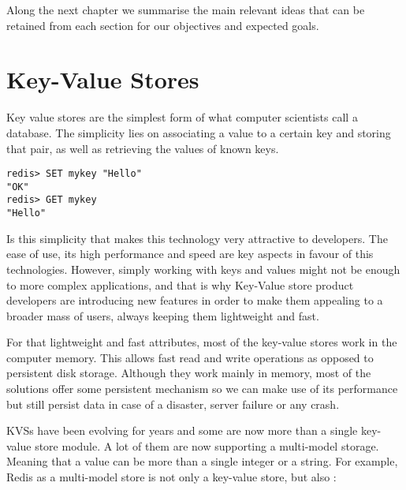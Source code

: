 Along the next chapter we summarise the main relevant ideas that can be retained from each section for our objectives and expected goals.

\section{Key-Value Stores} %
\label{sec:key-value_stores}

Key value stores are the simplest form of what computer scientists call a database. The simplicity lies on associating a value to a certain key and storing that pair, as well as retrieving the values of known keys. \cite{db-engine:1}

\lstset{language=Bash, caption=Redis Set \& Get, label=lst:redisSetGet}
\begin{lstlisting}
redis> SET mykey "Hello"
"OK"
redis> GET mykey
"Hello"
\end{lstlisting}

Is this simplicity that makes this technology very attractive to developers. The ease of use, its high performance and speed are key aspects in favour of this technologies. However, simply working with keys and values might not be enough to more complex applications, and that is why Key-Value store product developers are introducing new features in order to make them appealing to a broader mass of users, always keeping them lightweight and fast.

For that lightweight and fast attributes, most of the key-value stores work in the computer memory. This allows fast read and write operations as opposed to persistent disk storage. Although they work mainly in memory, most of the solutions offer some persistent mechanism so we can make use of its performance but still persist data in case of a disaster, server failure or any crash.

\glspl{KVS} have been evolving for years and some are now more than a single key-value store module. A lot of them are now supporting a multi-model storage. Meaning that a value can be more than a single integer or a string. For example, Redis \cite{redis:1} as a multi-model store is not only a key-value store, but also \cite{redis:2}:

